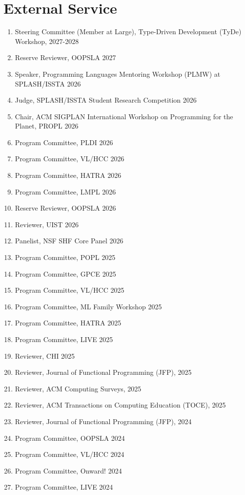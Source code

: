 \documentclass[10pt,letterpaper]{article}
\begin{document}
\section*{External Service}
\begin{enumerate}
  \item Steering Committee (Member at Large), Type-Driven Development (TyDe) Workshop, 2027-2028
  \item Reserve Reviewer, OOPSLA 2027
  \item Speaker, Programming Languages Mentoring Workshop (PLMW) at SPLASH/ISSTA 2026
  \item Judge, SPLASH/ISSTA Student Research Competition 2026
  \item Chair, ACM SIGPLAN International Workshop on Programming for the Planet, PROPL 2026
  \item Program Committee, PLDI 2026
  \item Program Committee, VL/HCC 2026
  \item Program Committee, HATRA 2026
  \item Program Committee, LMPL 2026
  \item Reserve Reviewer, OOPSLA 2026
  \item Reviewer, UIST 2026
  \item Panelist, NSF SHF Core Panel 2026
  \item Program Committee, POPL 2025
  \item Program Committee, GPCE 2025
  \item Program Committee, VL/HCC 2025
  \item Program Committee, ML Family Workshop 2025
  \item Program Committee, HATRA 2025
  \item Program Committee, LIVE 2025
  \item Reviewer, CHI 2025
  \item Reviewer, Journal of Functional Programming (JFP), 2025
  \item Reviewer, ACM Computing Surveys, 2025
  \item Reviewer, ACM Transactions on Computing Education	(TOCE), 2025
  \item Reviewer, Journal of Functional Programming (JFP), 2024
  \item Program Committee, OOPSLA 2024
  \item Program Committee, VL/HCC 2024
  \item Program Committee, Onward! 2024
  \item Program Committee, LIVE 2024

\end{enumerate}
\end{document}
